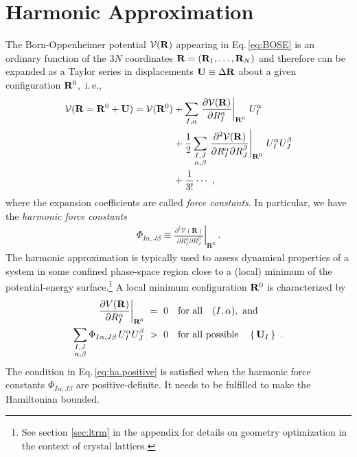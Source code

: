 \section{Harmonic Approximation}
\label{sec:HA}
The Born-Oppenheimer potential $\mathcal V ({\bf R})$ appearing in Eq.\,\eqref{eq:BOSE} is an ordinary function of the $3 N$ coordinates ${\bf R} = ({\bf R}_1, \ldots, {\bf R}_{N})$ and therefore can be expanded as a Taylor series in displacements ${\bf U} \equiv \Delta {\bf R}$ about a given configuration ${\bf R}^0$,~i.\,e.,
\begin{align}
\begin{split}
  \mathcal V ({\bf R} = {\bf R}^0 + {\bf U})
    = \mathcal V ({\bf R}^0)
    &+ \sum_{I, \alpha} 
      \left. \frac{\partial \mathcal V({\bf R})}{\partial R^\alpha_I} 
      \right\vert_{{\bf R}^0}
    \,U^\alpha_I
    \\
    &
    + \frac{1}{2}
    \sum_{\substack{I, J \\ \alpha, \beta}}
    \left.\frac{\partial^{2} \mathcal{V}(\mathbf{R})}{\partial R_{I}^{\alpha} \partial R_{J}^{\beta}}\right|_{\mathbf{R}^{0}}
    \, U_I^\alpha U_J^\beta
    \\
    &+\frac{1}{3!}\cdots ~,
\end{split}
\end{align}
where the expansion coefficients are called \emph{force constants}. In particular, we have the \emph{harmonic force constants}
\begin{align}
  \Phi_{I \alpha, J \beta}
  \equiv \left.\frac{\partial^{2} \mathcal{V}(\mathbf{R})}{\partial R_{I}^{\alpha} \partial R_{J}^{\beta}}\right|_{\mathbf{R}^{0}}~.
  \label{eq:FC2}
\end{align}
The harmonic approximation is typically used to assess dynamical properties of a system in some confined phase-space region close to a (local) minimum of the potential-energy surface.\footnote{See section \ref{sec:ltrm} in the appendix for details on geometry optimization in the context of crystal lattices.} A local minimum configuration ${\bf R}^0$ is characterized by
\begin{align}
	\left. \frac{\partial V({\bf R})}{\partial R^\alpha_I} 
	\right\vert_{{\bf R}^0} 
		&~=~ 0 \quad\text{for all}\quad (I, \alpha),~\text{and} \\
	\sum_{\substack{I, J \\ \alpha, \beta}}
	\Phi_{I \alpha, J \beta}
	\, U_I^\alpha U_J^\beta
		&~>~ 0 \quad\text{for all possible}\quad \set{{\bf U}_I}~.
	\label{eq:ha.positive}
\end{align}
The condition in Eq.\,\eqref{eq:ha.positive} is satisfied when the harmonic force constants $\Phi_{I \alpha, J \beta}$ are positive-definite. It needs to be fulfilled to make the Hamiltonian bounded.

